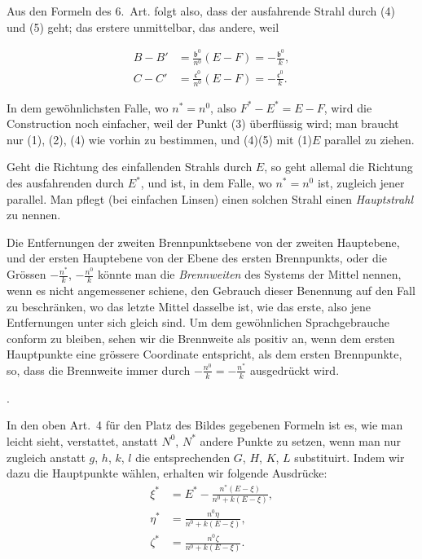 \documentclass[11pt,a4paper]{article}
\begin{document}
Aus den Formeln des 6.~Art. folgt also, dass der ausfahrende Strahl durch (4) und (5) geht; das erstere unmittelbar, das andere, weil

\newpage
\noindent
\begin{align*}
B - B' &= \tfrac{\mathfrak{b}^0}{n^0}(E - F) = -\tfrac{\mathfrak{b}^0}{k}, \\
C - C' &= \tfrac{\mathfrak{c}^0}{n^0}(E - F) = -\tfrac{\mathfrak{c}^0}{k}.
\end{align*}

In dem gewöhnlichsten Falle, wo $n^* = n^0$, also $F^* - E^* = E - F$, wird die Construction noch einfacher, weil der Punkt (3) überflüssig wird; man braucht nur (1), (2), (4) wie vorhin zu bestimmen, und (4)(5) mit (1)$E$ parallel zu ziehen.

Geht die Richtung des einfallenden Strahls durch $E$, so geht allemal die Richtung des ausfahrenden durch $E^*$, und ist, in dem Falle, wo $n^* = n^0$ ist, zugleich jener parallel. Man pflegt (bei einfachen Linsen) einen solchen Strahl einen \textit{Hauptstrahl} zu nennen.

Die Entfernungen der zweiten Brennpunktsebene von der zweiten Hauptebene, und der ersten Hauptebene von der Ebene des ersten Brennpunkts, oder die Grössen $-\frac{n^*}{k}$, $-\frac{n^0}{k}$ könnte man die \textit{Brennweiten} des Systems der Mittel nennen, wenn es nicht angemessener schiene, den Gebrauch dieser Benennung auf den Fall zu beschränken, wo das letzte Mittel dasselbe ist, wie das erste, also jene Entfernungen unter sich gleich sind. Um dem gewöhnlichen Sprachgebrauche conform zu bleiben, sehen wir die Brennweite als positiv an, wenn dem ersten Hauptpunkte eine grössere Coordinate entspricht, als dem ersten Brennpunkte, so, dass die Brennweite immer durch $-\frac{n^0}{k} = -\frac{n^*}{k}$ ausgedrückt wird.

\bigskip{}.

\smallskip
In den oben Art.~4 für den Platz des Bildes gegebenen Formeln ist es, wie man leicht sieht, verstattet, anstatt $N^0$, $N^*$ andere Punkte zu setzen, wenn man nur zugleich anstatt $g$, $h$, $k$, $l$ die entsprechenden $G$, $H$, $K$, $L$ substituirt. Indem wir dazu die Hauptpunkte wählen, erhalten wir folgende Ausdrücke:
\begin{align*}
\xi^* &= E^* - \frac{n^*(E - \xi)}{n^0 + k(E - \xi)}, \\
\eta^* &= \frac{n^0 \eta}{n^0 + k(E - \xi)}, \\
\zeta^* &= \frac{n^0 \zeta}{n^0 + k(E - \xi)}.
\end{align*}
\end{document}

